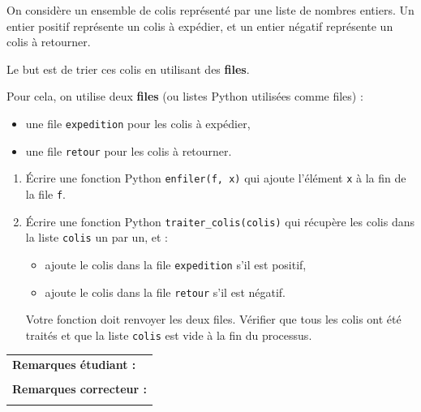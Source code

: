 \documentclass[a4paper,11pt]{article}
\begin{document}
On considère un ensemble de colis représenté par une liste de nombres entiers.  
Un entier positif représente un colis à expédier, et un entier négatif représente un colis à retourner.

Le but est de trier ces colis en utilisant  des \textbf{files}.

Pour cela, on utilise  deux \textbf{files} (ou listes Python utilisées comme files) :
    \begin{itemize}
        \item une file \texttt{expedition} pour les colis à expédier,
        \item une file \texttt{retour} pour les colis à retourner.
    \end{itemize}


\begin{enumerate}
    \item Écrire une fonction Python \texttt{enfiler(f, x)} qui ajoute l'élément \texttt{x} à la fin de la file \texttt{f}.
    
    \item Écrire une fonction Python \texttt{traiter\_colis(colis)} qui récupère les colis dans la liste \texttt{colis} un par un, 
    et :
    \begin{itemize}
        \item ajoute le colis dans la file \texttt{expedition} s'il est positif,
        \item ajoute le colis dans la file \texttt{retour} s'il est négatif.
    \end{itemize}
Votre fonction doit renvoyer les deux files.     
Vérifier que tous les colis ont été traités et que la liste \texttt{colis} est vide à la fin du processus.
\end{enumerate}

\vspace{0.2 cm}

\begin{table}[h!]
\centering
\renewcommand{\arraystretch}{1.4} %
\begin{tabular}{|p{15cm}|}
\hline
\textbf{Remarques étudiant :}    \\
 \\
\hline
\textbf{Remarques correcteur :}  \\
 \\
\hline
\end{tabular}
\end{table}
\end{document}
